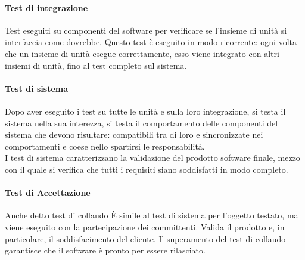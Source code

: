                 \paragraph{Test di integrazione}
                    Test eseguiti su componenti del software per verificare se l'insieme di unità si interfaccia come dovrebbe. Questo test è eseguito in modo ricorrente: ogni volta che un insieme di unità esegue correttamente, esso viene integrato con altri insiemi di unità, fino al test completo sul sistema.\\
                \paragraph{Test di sistema}
                    Dopo aver eseguito i test su tutte le unità e sulla loro integrazione, si testa il sistema nella sua interezza, si testa il comportamento delle componenti del sistema che devono risultare: compatibili tra di loro e sincronizzate nei comportamenti e coese nello spartirsi le responsabilità.\\
                    I test di sistema caratterizzano la validazione del prodotto software finale, mezzo con il quale si verifica che tutti i requisiti siano soddisfatti in modo completo.\\
                \paragraph{Test di Accettazione}
                    Anche detto test di collaudo È simile al test di sistema per l’oggetto testato, ma viene eseguito con la partecipazione dei committenti. Valida il prodotto e, in particolare, il soddisfacimento del cliente. Il superamento del test di collaudo garantisce che il software è pronto per essere rilasciato.
